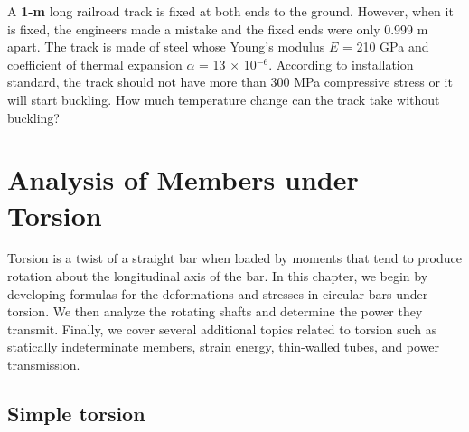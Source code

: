\documentclass[
10pt,
a4paper,
openany,
svgnames,
]{book} %
\begin{document}
\begin{exercises}
\item A \textbf{1-m} long railroad track is fixed at both ends to the ground. However, when it is fixed, the engineers made a mistake and the fixed ends were only 0.999 m apart. The track is made of steel whose Young's modulus $E$ = 210 GPa and coefficient of thermal expansion $\alpha$ = 13 $\times$ 10$^{-6}$. According to installation standard, the track should  not have more than 300 MPa compressive stress or it will start buckling. How much temperature change can the track take without buckling?

  \begin{figure}[H]
    \centering
    \centering
  \end{figure}

\end{exercises}

\chapter{Analysis of Members under Torsion}

Torsion is a twist of a straight bar when loaded by moments that tend to produce rotation about the longitudinal axis of the bar. In this chapter, we begin by developing formulas for the deformations and stresses in circular bars under torsion. We then analyze the rotating shafts and determine the power they transmit. Finally, we cover several additional topics related to torsion such as statically indeterminate members, strain energy, thin-walled tubes, and power transmission.

\section{Simple torsion}
\end{document}
